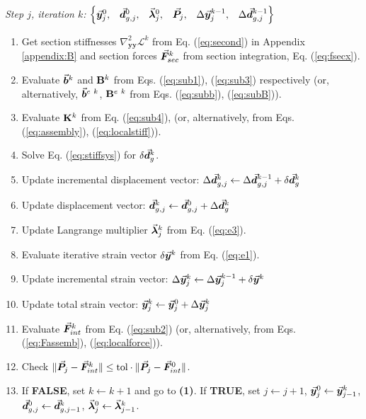 \noindent \textit{Step $j$, iteration $k$:} $ \begin{Bmatrix}
	\vec{\boldsymbol{y}}^0_j, & \vec{\boldsymbol{d}}^0_{g,j}, & \vec{\boldsymbol{\lambda}}^0_j, & \vec{\boldsymbol{P}}_j, &
	\Delta\vec{\boldsymbol{y}}^{k-1}_j, &
	\Delta\vec{\boldsymbol{d}}_{g,j}^{k-1}
\end{Bmatrix}$
\begin{enumerate}[start=1,label={\bfseries (\arabic*):}]
	\item Get section stiffnesses $\nabla_{\mathbf{yy}}^2\mathcal{L}^k$ from Eq.
	(\ref{eq:second}) in Appendix \ref{appendix:B} and section forces 
	$\vec{\boldsymbol{F}}_{sec}^k$ 
	from section integration, Eq. (\ref{eq:fsecx}).
	\item Evaluate $\vec{\boldsymbol{b}}^k$ and $\mathbf{B}^k$ from Eqs. (\ref{eq:sub1}),
	(\ref{eq:sub3}) respectively (or, alternatively, $\vec{\boldsymbol{b}}^{e\ k}$,
	$\mathbf{B}^{e\ k}$ from Eqs. (\ref{eq:subb}),
	(\ref{eq:subB})).
	\item Evaluate $\mathbf{K}^k$ from Eq. (\ref{eq:sub4}), (or, alternatively,
	from Eqs. (\ref{eq:assembly}), (\ref{eq:localstiff})).
	\item Solve Eq. (\ref{eq:stiffsys}) for $\delta\vec{\boldsymbol{d}}_g^k$.
	\item Update incremental displacement vector: $\Delta\vec{\boldsymbol{d}}_{g,j}^k 
	\leftarrow
	\Delta\vec{\boldsymbol{d}}_{g,j}^{k-1} +\delta\vec{\boldsymbol{d}}_g^k$
	\item Update displacement vector: $\vec{\boldsymbol{d}}_{g,j}^k \leftarrow
	\vec{\boldsymbol{d}}_{g,j}^0 + \Delta\vec{\boldsymbol{d}}_g^k$
	\item Update Langrange multiplier $\vec{\boldsymbol{\lambda}}_j^k$ from Eq.
	(\ref{eq:e3}).
	\item Evaluate iterative strain vector $\delta\vec{\boldsymbol{y}}^k$ from Eq.
	(\ref{eq:e1}).
	\item Update incremental strain vector: $\Delta\vec{\boldsymbol{y}}_j^k
	\leftarrow\Delta\vec{\boldsymbol{y}}_j^{k-1}+\delta\vec{\boldsymbol{y}}^k$
	\item Update total strain vector: $\vec{\boldsymbol{y}}_{j}^k \leftarrow \vec{\boldsymbol{y}}_j^0 +
	\Delta\vec{\boldsymbol{y}}_j^k$
	\item Evaluate $\vec{\boldsymbol{F}}_{int}^k$ from Eq. (\ref{eq:sub2}) (or,
	alternatively, from Eqs. (\ref{eq:Fassemb}), (\ref{eq:localforce})).
	\item Check $\Vert \vec{\boldsymbol{P}}_j-\vec{\boldsymbol{F}}_{int}^k\Vert \leq
	\text{tol}\cdot \Vert \vec{\boldsymbol{P}}_j-\vec{\boldsymbol{F}}_{int}^0\Vert$. 
	\item If \textbf{FALSE}, set $k\leftarrow k+1$ and go to \textbf{(1)}. If
	\textbf{TRUE}, set $j\leftarrow j+1$, $\vec{\boldsymbol{y}}^0_j\leftarrow
	\vec{\boldsymbol{y}}^k_{j-1}$, $\vec{\boldsymbol{d}}^0_{g,j}\leftarrow \vec{\boldsymbol{d}}^k_{g,j-1}$, 
	$\vec{\boldsymbol{\lambda}}^0_j\leftarrow \vec{\boldsymbol{\lambda}}^k_{j-1}$.
\end{enumerate}

